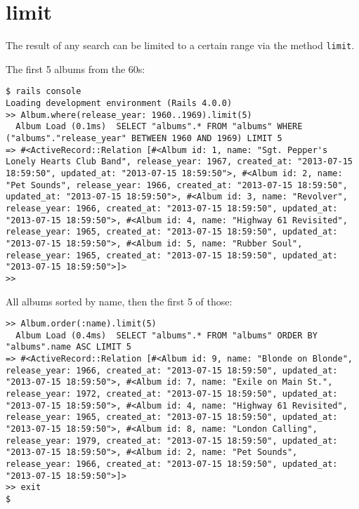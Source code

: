 \documentclass[a4paper]{book}
\newcommand{\chap}[1]{\newpage\thispagestyle{empty}\chapter{#1}\label{chap:\thechapter}}
\begin{document}
\chap{limit}\label{limit}

The result of any search can be limited to a certain range via the method \texttt{limit}.

The first 5 albums from the 60s:

\begin{shaded}\begin{verbatim}
$ rails console
Loading development environment (Rails 4.0.0)
>> Album.where(release_year: 1960..1969).limit(5)
  Album Load (0.1ms)  SELECT "albums".* FROM "albums" WHERE ("albums"."release_year" BETWEEN 1960 AND 1969) LIMIT 5
=> #<ActiveRecord::Relation [#<Album id: 1, name: "Sgt. Pepper's Lonely Hearts Club Band", release_year: 1967, created_at: "2013-07-15 18:59:50", updated_at: "2013-07-15 18:59:50">, #<Album id: 2, name: "Pet Sounds", release_year: 1966, created_at: "2013-07-15 18:59:50", updated_at: "2013-07-15 18:59:50">, #<Album id: 3, name: "Revolver", release_year: 1966, created_at: "2013-07-15 18:59:50", updated_at: "2013-07-15 18:59:50">, #<Album id: 4, name: "Highway 61 Revisited", release_year: 1965, created_at: "2013-07-15 18:59:50", updated_at: "2013-07-15 18:59:50">, #<Album id: 5, name: "Rubber Soul", release_year: 1965, created_at: "2013-07-15 18:59:50", updated_at: "2013-07-15 18:59:50">]>
>>
\end{verbatim}\end{shaded}

All albums sorted by name, then the first 5 of those:

\begin{shaded}\begin{verbatim}
>> Album.order(:name).limit(5)
  Album Load (0.4ms)  SELECT "albums".* FROM "albums" ORDER BY "albums".name ASC LIMIT 5
=> #<ActiveRecord::Relation [#<Album id: 9, name: "Blonde on Blonde", release_year: 1966, created_at: "2013-07-15 18:59:50", updated_at: "2013-07-15 18:59:50">, #<Album id: 7, name: "Exile on Main St.", release_year: 1972, created_at: "2013-07-15 18:59:50", updated_at: "2013-07-15 18:59:50">, #<Album id: 4, name: "Highway 61 Revisited", release_year: 1965, created_at: "2013-07-15 18:59:50", updated_at: "2013-07-15 18:59:50">, #<Album id: 8, name: "London Calling", release_year: 1979, created_at: "2013-07-15 18:59:50", updated_at: "2013-07-15 18:59:50">, #<Album id: 2, name: "Pet Sounds", release_year: 1966, created_at: "2013-07-15 18:59:50", updated_at: "2013-07-15 18:59:50">]>
>> exit
$
\end{verbatim}\end{shaded}
\end{document}
